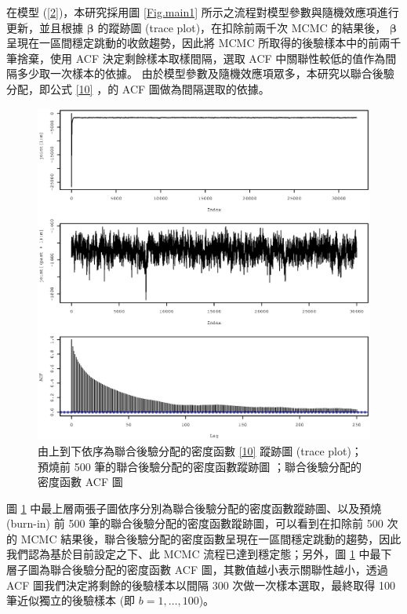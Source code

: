 \documentclass[12pt,a4paper]{article}
\begin{document}
\begin{CJK}{UTF8}{bkai}
在模型 (\ref{2})，本研究採用圖  \ref{Fig.main1} 所示之流程對模型參數與隨機效應項進行更新，並且根據 $\bm{\beta}$ 的蹤跡圖 (trace plot)，在扣除前兩千次 MCMC 的結果後， $\bm{\beta}$ 呈現在一區間穩定跳動的收斂趨勢，因此將 MCMC 所取得的後驗樣本中的前兩千筆捨棄，使用 ACF 決定剩餘樣本取樣間隔，選取 ACF 中關聯性較低的值作為間隔多少取一次樣本的依據。
由於模型參數及隨機效應項眾多，本研究以聯合後驗分配，即公式 \eqref{10} ，的 ACF 圖做為間隔選取的依據。
\begin{figure}[H]
\centering
\includegraphics[width=1\textwidth]{joint.eps}
\caption{由上到下依序為聯合後驗分配的密度函數  \eqref{10} 蹤跡圖 (trace plot)；預燒前 500 筆的聯合後驗分配的密度函數蹤跡圖 ；聯合後驗分配的密度函數 ACF 圖}
\label{Fig.main6}
\end{figure}
圖 \ref{Fig.main6} 中最上層兩張子圖依序分別為聯合後驗分配的密度函數蹤跡圖、以及預燒 (burn-in) 前 500 筆的聯合後驗分配的密度函數蹤跡圖，可以看到在扣除前 500 次的 MCMC 結果後，聯合後驗分配的密度函數呈現在一區間穩定跳動的趨勢，因此我們認為基於目前設定之下、此 MCMC 流程已達到穩定態；另外，圖 \ref{Fig.main6} 中最下層子圖為聯合後驗分配的密度函數 ACF 圖，其數值越小表示關聯性越小，透過 ACF 圖我們決定將剩餘的後驗樣本以間隔 300 次做一次樣本選取，最終取得 100 筆近似獨立的後驗樣本 (即 $b=1,\dots,100$)。


\end{CJK}
\end{document}
